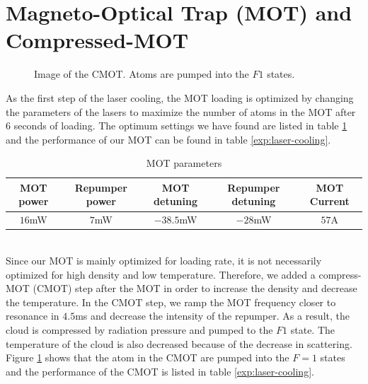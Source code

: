 \section{Magneto-Optical Trap (MOT) and Compressed-MOT}\label{exp:mot}
\begin{figure}
  \begin{center}
  \end{center}
  \caption{Image of the CMOT. Atoms are pumped into the $F1$ states.}
  \label{exp:cmot-image}
\end{figure}
As the first step of the laser cooling, the MOT loading is optimized by changing the parameters of the lasers to maximize the number of atoms in the MOT after $6$ seconds of loading. The optimum settings we have found are listed in table \ref{exp:mot-param} and the performance of our MOT can be found in table \ref{exp:laser-cooling}.\\
\begin{table}
  \begin{center}
    \begin{tabular}{|c|c|c|c|c|}\hline
      MOT power&Repumper power&MOT detuning&Repumper detuning&MOT Current\\\hline
      $16$mW&$7$mW&$-38.5$mW&$-28$mW&$57$A\\\hline
    \end{tabular}
  \end{center}
  \caption{MOT parameters}
  \label{exp:mot-param}
\end{table}\\
Since our MOT is mainly optimized for loading rate, it is not necessarily optimized for high density and low temperature. Therefore, we added a compress-MOT (CMOT) step after the MOT in order to increase the density and decrease the temperature. In the CMOT step, we ramp the MOT frequency closer to resonance in $4.5$ms and decrease the intensity of the repumper. As a result, the cloud is compressed by radiation pressure and pumped to the $F1$ state. The temperature of the cloud is also decreased because of the decrease in scattering. Figure \ref{exp:cmot-image} shows that the atom in the CMOT are pumped into the $F=1$ states and the performance of the CMOT is listed in table \ref{exp:laser-cooling}.

